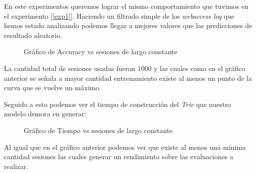 En este experimentos queremos lograr el mismo comportamiento que tuvimos en el experimento [\ref{exp1}]. Haciendo un filtrado simple de los \emph{webaccess log } que hemos estado analizando podemos llegar a mejores valores que las predicciones de resultado aleatorio.





	\begin{figure}[h] 
		\centering
		\caption{Gráfico de Accuracy vs sesiones de largo constante}
		\label{fig:sim}
	\end{figure}



	
	La cantidad total de sesiones usadas fueron $1000$ y las cuales como en el gráfico anterior se señala a mayor cantidad entrenamiento existe al menos un punto de la curva que se vuelve un máximo.


	Seguido a esto podemos ver el tiempo de construcción del \emph{Trie} que nuestro modelo demora en generar:
	
	
	
	\begin{figure}[h] 
		\centering
		\caption{Gráfico de Tiempo vs sesiones de largo constante}
		\label{fig:sim}
	\end{figure}
	
	

	Al igual que en el gráfico anterior podemos ver que existe al menos una mínima cantidad sesiones las cuales generar un rendimiento sobre las evaluaciones a realizar. 